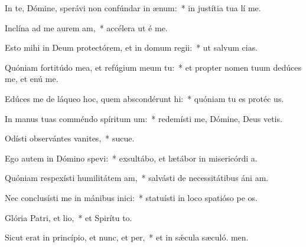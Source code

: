 \item In te, Dómine, sperávi non confúndar in ænum:~* in justítia tua lí me.
\item Inclína ad me aurem am,~* accélera ut é me.
\item Esto mihi in Deum protectórem, et in domum regii:~* ut salvum  cias.
\item Quóniam fortitúdo mea, et refúgium meum  tu:~* et propter nomen tuum dedúces me, et enú me.
\item Edúces me de láqueo hoc, quem abscondérunt hi:~* quóniam tu es protéc us.
\item In manus tuas comméndo spíritum um:~* redemísti me, Dómine, Deus vetis.
\item Odísti observántes vanites,~* sucue.
\item Ego autem in Dómino spevi:~* exsultábo, et lætábor in misericórdi a.
\item Quóniam respexísti humilitátem am,~* salvásti de necessitátibus áni am.
\item Nec conclusísti me in mánibus inici:~* statuísti in loco spatióso pe os.
\item Glória Patri, et lio,~* et Spirítu to.
\item Sicut erat in princípio, et nunc, et per,~* et in sǽcula sæculó. men.
